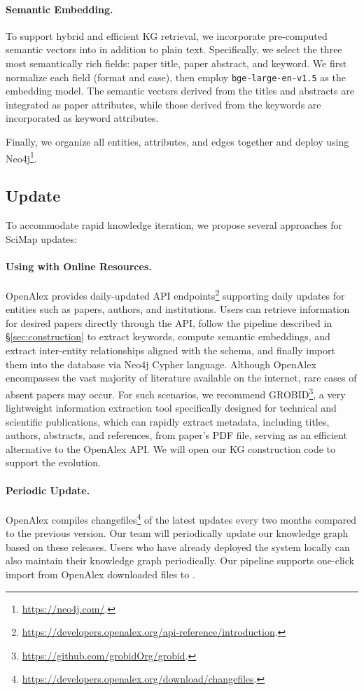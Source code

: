 \paragraph{Semantic Embedding.}
To support hybrid and efficient KG retrieval, we incorporate pre-computed semantic vectors into {\ours} in addition to plain text.
Specifically, we select the three most semantically rich fields: paper title, paper abstract, and keyword.
We first normalize each field (format and case), then employ \texttt{bge-large-en-v1.5} \citep{bge} as the embedding model.
The semantic vectors derived from the titles and abstracts are integrated as paper attributes, while those derived from the keywords are incorporated as keyword attributes.

Finally, we organize all entities, attributes, and edges together and deploy {\ours} using Neo4j\footnote{\url{https://neo4j.com/}.}.

\subsection{{\ours} Update}
To accommodate rapid knowledge iteration, we propose several approaches for SciMap updates:

\paragraph{Using with Online Resources.}
\label{sec:real_time_update}
OpenAlex provides daily-updated API endpoints\footnote{\url{https://developers.openalex.org/api-reference/introduction}.} supporting daily updates for entities such as papers, authors, and institutions. Users can retrieve information for desired papers directly through the API, follow the pipeline described in \S\ref{sec:construction} to extract keywords, compute semantic embeddings, and extract inter-entity relationships aligned with the {\ours} schema, and finally import them into the database via Neo4j Cypher language.
Although OpenAlex encompasses the vast majority of literature available on the internet, rare cases of absent papers may occur.
For such scenarios, we recommend GROBID\footnote{\url{https://github.com/grobidOrg/grobid}.}, a very lightweight information extraction tool specifically designed for technical and scientific publications, which can rapidly extract metadata, including titles, authors, abstracts, and references, from paper's PDF file, serving as an efficient alternative to the OpenAlex API.
We will open our KG construction code to support the evolution.

\paragraph{Periodic Update.}
OpenAlex compiles changefiles\footnote{\url{https://developers.openalex.org/download/changefiles}.} of the latest updates every two months compared to the previous version.
Our team will periodically update our knowledge graph based on these releases.
Users who have already deployed the system locally can also maintain their knowledge graph periodically.
Our pipeline supports one-click import from OpenAlex downloaded files to {\ours}.
